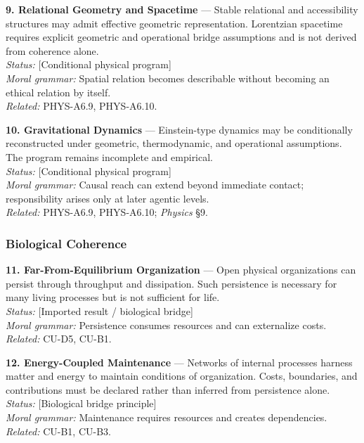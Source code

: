 \documentclass[
  11pt,
]{article}
\begin{document}
\textbf{9. Relational Geometry and Spacetime} --- Stable relational and
accessibility structures may admit effective geometric representation.
Lorentzian spacetime requires explicit geometric and operational bridge
assumptions and is not derived from coherence alone.\\
\emph{Status:} {[}Conditional physical program{]}\\
\emph{Moral grammar:} Spatial relation becomes describable without
becoming an ethical relation by itself.\\
\emph{Related:} PHYS-A6.9, PHYS-A6.10.

\textbf{10. Gravitational Dynamics} --- Einstein-type dynamics may be
conditionally reconstructed under geometric, thermodynamic, and
operational assumptions. The program remains incomplete and empirical.\\
\emph{Status:} {[}Conditional physical program{]}\\
\emph{Moral grammar:} Causal reach can extend beyond immediate contact;
responsibility arises only at later agentic levels.\\
\emph{Related:} PHYS-A6.9, PHYS-A6.10; \emph{Physics} §9.

\subsubsection{Biological Coherence}\label{biological-coherence}

\textbf{11. Far-From-Equilibrium Organization} --- Open physical
organizations can persist through throughput and dissipation. Such
persistence is necessary for many living processes but is not sufficient
for life.\\
\emph{Status:} {[}Imported result / biological bridge{]}\\
\emph{Moral grammar:} Persistence consumes resources and can externalize
costs.\\
\emph{Related:} CU-D5, CU-B1.

\textbf{12. Energy-Coupled Maintenance} --- Networks of internal
processes harness matter and energy to maintain conditions of
organization. Costs, boundaries, and contributions must be declared
rather than inferred from persistence alone.\\
\emph{Status:} {[}Biological bridge principle{]}\\
\emph{Moral grammar:} Maintenance requires resources and creates
dependencies.\\
\emph{Related:} CU-B1, CU-B3.
\end{document}
